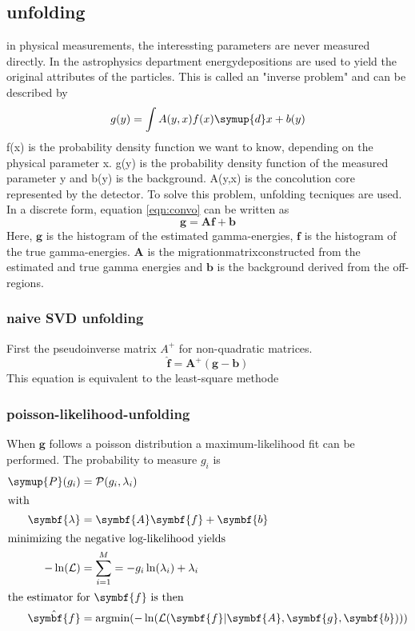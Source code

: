 \subsection{unfolding}
in physical measurements, the interessting parameters are never measured directly. In the astrophysics department energydepositions are used to yield the original attributes of the particles. This is called an "inverse problem" and can be described by
\begin{equation}
  g(y) = \int A(y,x) f(x) \symup{d}x + b(y)
  \label{eqn:convo}
\end{equation}
f(x) is the probability density function we want to know, depending on the physical parameter x. g(y) is the probability density function of the measured parameter y and b(y) is the background. A(y,x) is the concolution core represented by the detector.
To solve this problem, unfolding tecniques are used.
In a discrete form, equation \eqref{eqn:convo} can be written as
\begin{equation}
  \symbf{g} = \symbf{A}\symbf{f} + \symbf{b}
\end{equation}
Here, $\symbf{g}$ is the histogram of the estimated gamma-energies, $\symbf{f}$ is the histogram of the true gamma-energies.
$\symbf{A}$ is the migrationmatrixconstructed from the estimated and true gamma energies and $\symbf{b}$ is the background derived from the off-regions.

\subsubsection{naive SVD unfolding}
First the pseudoinverse matrix $A^{+}$ for non-quadratic matrices.
\begin{equation}
  \hat{\symbf{f}} = \symbf{A}^{+}(\symbf{g} - \symbf{b})
  \label{eqn:svd}
\end{equation}
This equation is equivalent to the least-square methode

\subsubsection{poisson-likelihood-unfolding}
When $\symbf{g}$ follows a poisson distribution a maximum-likelihood fit can be performed.
The probability to measure $g_i$ is
\begin{align}
  \symup{P}(g_i) &= \mathcal{P}(g_i, \lambda_i) \\
  \shortintertext{with}
  \symbf{\lambda} &= \symbf{A}\symbf{f} + \symbf{b} \\
  \intertext{minimizing the negative log-likelihood yields}
  -\ln(\mathcal{L}) &= \sum_{i=1}^{M} = -g_i \ln(\lambda_i) + \lambda_i \\
  \intertext{the estimator for $\symbf{f}$ is then}
  \hat{\symbf{f}} &= \text{argmin}(-\ln(\mathcal{L}(\symbf{f}|\symbf{A},\symbf{g},\symbf{b})))
\end{align}
